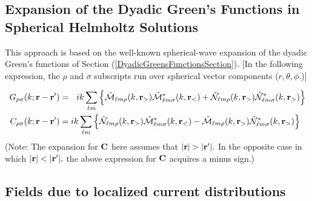 \documentclass[letterpaper]{article}
\begin{document}
\subsection*{Expansion of the Dyadic Green's Functions in Spherical Helmholtz Solutions}

This approach is based on the well-known spherical-wave expansion 
of the dyadic Green's functions of Section (\ref{DyadicGreensFunctionsSection}).
[In the following expression, the $\rho$ and $\sigma$ subscripts run over
spherical vector components ($r,\theta,\phi$.)]

\begin{subequations}
\begin{align}
  G_{\rho\sigma} (k; \mathbf{r}-\mathbf{r}^\prime)
&=\hspace{0.09in} ik
  \sum_{\ell m} 
  \Big\{ 
     \check{\mathcal{M}}_{\ell m \rho}( k, \mathbf{r}_>)
     \hat{\mathcal{M}}^*_{\ell m \sigma}( k, \mathbf{r}_<) 
   + \check{\mathcal{N}}_{\ell m \rho}( k, \mathbf{r}_>)
     \hat{\mathcal{N}}^*_{\ell m \sigma}( k, \mathbf{r}_>) 
  \Big\}
\\
  C_{\rho\sigma} (k; \mathbf{r}-\mathbf{r}^\prime)
&=ik
  \sum_{\ell m} 
  \Big\{ 
     \check{\mathcal{N}}_{\ell m \rho}( k, \mathbf{r}_>)
     \hat{\mathcal{M}}^*_{\ell m \sigma}( k, \mathbf{r}_<) 
   - \check{\mathcal{M}}_{\ell m \rho}( k, \mathbf{r}_>)
     \hat{\mathcal{N}}^*_{\ell m \sigma}( k, \mathbf{r}_>) 
  \Big\}
\end{align}
\label{GCExpansions}
\end{subequations}
(Note: The expansion for $\mathbf{C}$ here assumes that 
$|\vb r|>|\vb r^\prime|.$ In the opposite case in 
which 
$|\vb r|<|\vb r^\prime|,$ the above expression for $\mathbf{C}$
acquires a minus sign.)

\subsection*{Fields due to localized current distributions}
\end{document}
